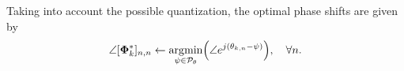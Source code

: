 
Taking into account the possible quantization, the optimal phase shifts are given by
\begin{equation}
    \angle[\bm{\Phi}^*_k]_{n,n} \leftarrow
    \argmin_{\substack{\psi \in \mathcal{P}_{\theta}}}\left(\angle e^{j(\theta_{k, n}-\psi)}\right), \quad \forall n.  
\end{equation}

